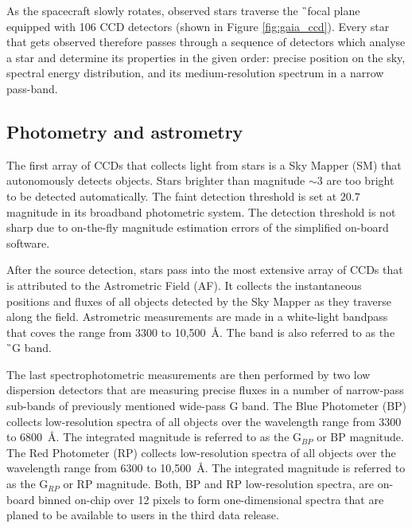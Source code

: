 As the spacecraft slowly rotates, observed stars traverse the \G\ focal plane equipped with 106 CCD detectors (shown in Figure \ref{fig:gaia_ccd}). Every star that gets observed therefore passes through a sequence of detectors which analyse a star and determine its properties in the given order: precise position on the sky, spectral energy distribution, and its medium-resolution spectrum in a narrow pass-band.

\subsection{Photometry and astrometry}
The first array of CCDs that collects light from stars is a Sky Mapper (SM) that autonomously detects objects. Stars brighter than magnitude $\sim3$ are too bright to be detected automatically. The faint detection threshold is set at $20.7$ magnitude in its broadband photometric system. The detection threshold is not sharp due to on-the-fly magnitude estimation errors of the simplified on-board software.

After the source detection, stars pass into the most extensive array of CCDs that is attributed to the Astrometric Field (AF). It collects the instantaneous positions and fluxes of all objects detected by the Sky Mapper as they traverse along the field. Astrometric measurements are made in a white-light bandpass that coves the range from 3300 to 10,500~\AA. The band is also referred to as the \G\ G band.

The last spectrophotometric measurements are then performed by two low dispersion detectors that are measuring precise fluxes in a number of narrow-pass sub-bands of previously mentioned wide-pass G band. The Blue Photometer (BP) collects low-resolution spectra of all objects over the wavelength range from 3300 to 6800~\AA. The integrated magnitude is referred to as the G$_{BP}$ or BP magnitude. The Red Photometer (RP) collects low-resolution spectra of all objects over the wavelength range from 6300 to 10,500~\AA. The integrated magnitude is referred to as the G$_{RP}$ or RP magnitude. Both, BP and RP low-resolution spectra, are on-board binned on-chip over 12 pixels to form one-dimensional spectra that are planed to be available to users in the third data release.

